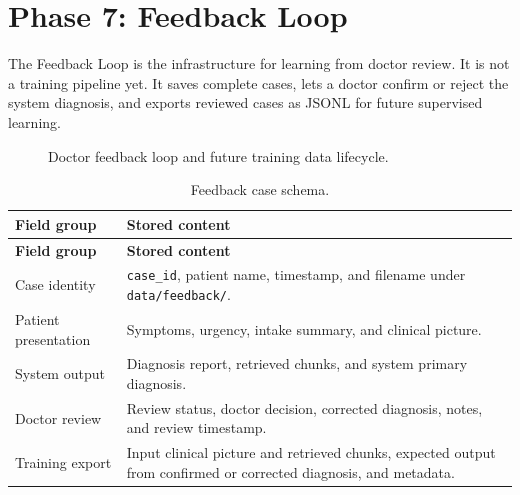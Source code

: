 \section{Phase 7: Feedback Loop}

The Feedback Loop is the infrastructure for learning from doctor review. It is not a training pipeline yet. It saves complete cases, lets a doctor confirm or reject the system diagnosis, and exports reviewed cases as JSONL for future supervised learning.

\begin{figure}[htbp]
\centering
{}
\caption{Doctor feedback loop and future training data lifecycle.}
\label{fig:feedback_loop}
\end{figure}

\begin{longtable}{p{} p{}}
\caption{Feedback case schema.}
\label{tab:feedback_schema}\\
\toprule
\textbf{Field group} & \textbf{Stored content}\\
\midrule
\endfirsthead
\toprule
\textbf{Field group} & \textbf{Stored content}\\
\midrule
\endhead
Case identity & \texttt{case\_id}, patient name, timestamp, and filename under \texttt{data/feedback/}.\\
Patient presentation & Symptoms, urgency, intake summary, and clinical picture.\\
System output & Diagnosis report, retrieved chunks, and system primary diagnosis.\\
Doctor review & Review status, doctor decision, corrected diagnosis, notes, and review timestamp.\\
Training export & Input clinical picture and retrieved chunks, expected output from confirmed or corrected diagnosis, and metadata.\\
\bottomrule
\end{longtable}

